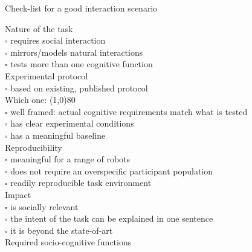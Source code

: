 \documentclass[compress]{beamer}
\begin{document}
\begin{frame}{Check-list for a good interaction scenario}
    \scriptsize
    \begin{multicols}{2}

        {\Medium Nature of the task}\\
        $\square$ requires social interaction\\
        $\square$ mirrors/models natural interactions\\
        $\square$ tests more than one cognitive function\\


        {\Medium Experimental protocol}\\
        $\square$ based on existing, published protocol\\
        Which one: \line(1,0){80}\\
        $\square$ well framed: actual cognitive requirements match what is tested\\
        $\square$ has clear experimental conditions\\
        $\square$ has a meaningful baseline\\

        {\Medium Reproducibility}\\
        $\square$ meaningful for a range of robots\\
        $\square$ does not require an overspecific participant population\\
        $\square$ readily reproducible task environment\\

        {\Medium Impact}\\
        $\square$ is socially relevant\\
        $\square$ the intent of the task can be explained in one sentence\\
        $\square$ it is beyond the state-of-art\\

        {\Medium Required socio-cognitive functions}


\end{multicols}
\end{frame}
\end{document}
